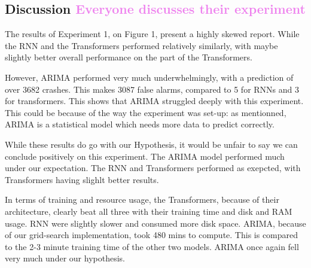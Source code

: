 \documentclass[12pt, letterpaper]{article}
\begin{document}
\subsection*{Discussion \textcolor{violet}{Everyone discusses their experiment}}

The results of Experiment 1, on Figure 1, present a highly skewed report. While the RNN and the Transformers performed relatively similarly, with maybe slightly better overall performance on the part of the Transformers.

However, ARIMA performed very much underwhelmingly, with a prediction of over 3682 crashes. This makes 3087 false alarms, compared to 5 for RNNs and 3 for transformers. This shows that ARIMA struggled deeply with this experiment. This could be because of the way the experiment was set-up: as mentionned, ARIMA is a statistical model which needs more data to predict correctly.

While these results do go with our Hypothesis, it would be unfair to say we can conclude positively on this experiment. The ARIMA model performed much under our expectation. The RNN and Transformers performed as exepcted, with Transformers having slighlt better results.

In terms of training and resource usage, the Transformers, because of their architecture, clearly beat all three with their training time and disk and RAM usage. RNN were slightly slower and consumed more disk space. ARIMA, because of our grid-search implementation, took 480 mins to compute. This is compared to the 2-3 minute training time of the other two models. ARIMA once again fell very much under our hypothesis.
\end{document}
